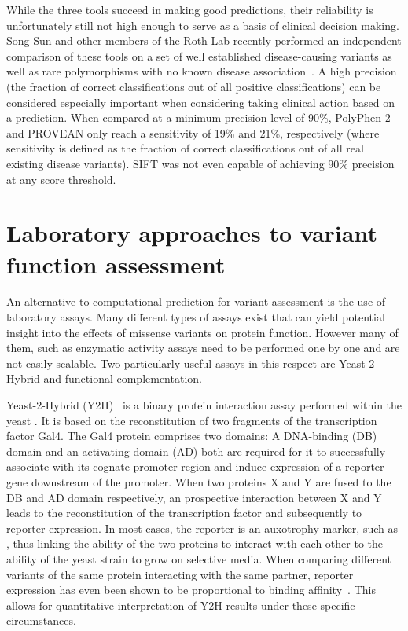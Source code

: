 While the three tools succeed in making good predictions, their reliability is unfortunately still not high enough to serve as a basis of clinical decision making. Song Sun and other members of the Roth Lab recently performed an independent comparison of these tools on a set of well established disease-causing variants as well as rare polymorphisms with no known disease association~\cite{sun_extended_2016}. A high precision (the fraction of correct classifications out of all positive classifications) can be considered especially important when considering taking clinical action based on a prediction. When compared at a minimum precision level of 90\%, PolyPhen-2 and PROVEAN only reach a sensitivity of 19\% and 21\%, respectively (where sensitivity is defined as the fraction of correct classifications out of all real existing disease variants). SIFT was not even capable of achieving 90\% precision at any score threshold.

\section{Laboratory approaches to variant function assessment}

An alternative to computational prediction for variant assessment is the use of laboratory assays. Many different types of assays exist that can yield potential insight into the effects of missense variants on protein function. However many of them, such as enzymatic activity assays need to be performed one by one and are not easily scalable. Two particularly useful assays in this respect are Yeast-2-Hybrid and functional complementation.

Yeast-2-Hybrid (Y2H)~\cite{FieldsSongY2H} is a binary protein interaction assay performed within the yeast . It is based on the reconstitution of two fragments of the transcription factor Gal4. The Gal4 protein comprises two domains: A DNA-binding (DB) domain and an activating domain (AD) both are required for it to successfully associate with its cognate promoter region and induce expression of a reporter gene downstream of the promoter. When two proteins X and Y are fused to the DB and AD domain respectively, an prospective interaction between X and Y leads to the reconstitution of the transcription factor and subsequently to reporter expression. In most cases, the reporter is an auxotrophy marker, such as , thus linking the ability of the two proteins to interact with each other to the ability of the yeast strain to grow on selective media. When comparing different variants of the same protein interacting with the same partner, reporter expression has even been shown to be proportional to binding affinity~\cite{FieldsY2HAffinity}. This allows for quantitative interpretation of Y2H results under these specific circumstances. 

